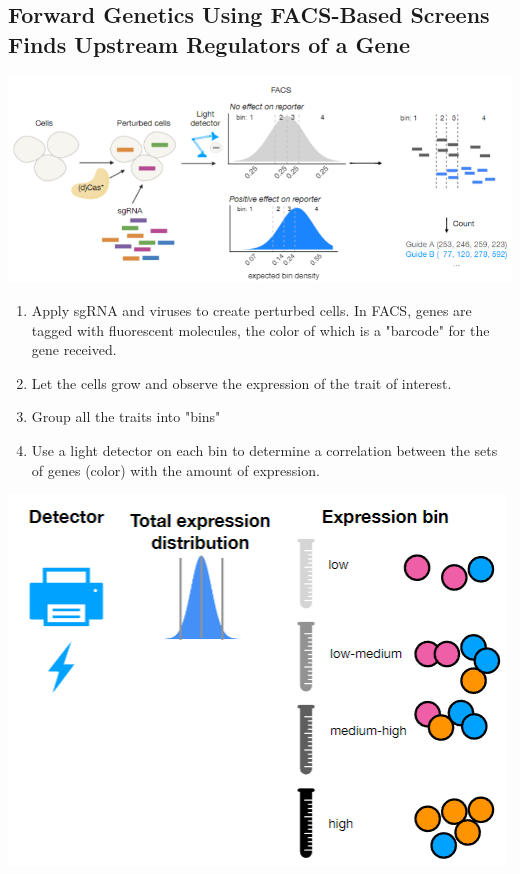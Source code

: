 \documentclass[10pt]{article}
\begin{document}
\subsection*{Forward Genetics Using FACS-Based Screens Finds Upstream Regulators of a Gene}
\begin{center} 
    \includegraphics*[scale=0.8]{W9_4.png}
\end{center}
\begin{enumerate}
    \item Apply sgRNA and viruses to create perturbed cells.  In FACS, genes are tagged with fluorescent molecules, the color of which is a "barcode" for the gene received.
    \item Let the cells grow and observe the expression of the trait of interest.
    \item Group all the traits into "bins"
    \item Use a light detector on each bin to determine a correlation between the sets of genes (color) with the amount of expression.
\end{enumerate}
\begin{center}
    \includegraphics*[scale=0.8]{W9_5.png}
\end{center}
\end{document}
